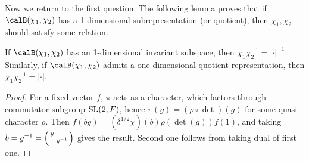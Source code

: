 Now we return to the first question. The following lemma proves that if $\calB(\chi_1, \chi_2)$ has a 1-dimensional subrepresentation (or quotient), then $\chi_1, \chi_2$ should satisfy some relation. 
\begin{lemma}
If $\calB(\chi_1, \chi_2)$ has an 1-dimensional invariant subspace, then $\chi_{1}\chi_{2}^{-1} = |\cdot |^{-1}$. Similarly, if $\calB(\chi_1, \chi_2)$ admits a one-dimensional quotient representation, then $\chi_{1}\chi_{2}^{-1} = |\cdot |$. 
\end{lemma}
\begin{proof}
For a fixed vector $f$, $\pi$ acts as a character, which factors through commutator subgroup $\mathrm{SL}(2,F)$, hence $\pi(g) = (\rho\circ\det)(g)$ for some quasi-character $\rho$. Then $f(bg) = (\delta^{1/2} \chi)(b) \rho(\det(g)) f(1)$, and taking $b = g^{-1} =\left(\begin{smallmatrix} y &  \\  & y^{-1} \end{smallmatrix}\right)$ gives the result. Second one follows from taking dual of first one. 
\end{proof}

